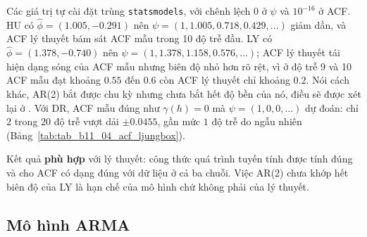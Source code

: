  Các giá trị tự cài đặt trùng \texttt{statsmodels}, với chênh lệch $0$ ở $\psi$ và $10^{-16}$ ở ACF. HU có $\hat\phi=(1.005,-0.291)$ nên $\psi=(1,1.005,0.718,0.429,\dots)$ giảm dần, và ACF lý thuyết bám sát ACF mẫu trong 10 độ trễ đầu. LY có $\hat\phi=(1.378,-0.740)$ nên $\psi=(1,1.378,1.158,0.576,\dots)$; ACF lý thuyết tái hiện dạng sóng của ACF mẫu nhưng biên độ nhỏ hơn rõ rệt, vì ở độ trễ 9 và 10 ACF mẫu đạt khoảng $0.55$ đến $0.6$ còn ACF lý thuyết chỉ khoảng $0.2$. Nói cách khác, AR(2) bắt được chu kỳ nhưng chưa bắt hết độ bền của nó, điều sẽ được xét lại ở . Với DR, ACF mẫu đúng như $\gamma(h)=0$ mà $\psi=(1,0,0,\dots)$ dự đoán: chỉ $2$ trong $20$ độ trễ vượt dải $\pm0.0455$, gần mức $1$ độ trễ do ngẫu nhiên (Bảng~\ref{tab:tab_b11_04_acf_ljungbox}).

 Kết quả \textbf{phù hợp} với lý thuyết: công thức quá trình tuyến tính được tính đúng và cho ACF có dạng đúng với dữ liệu ở cả ba chuỗi. Việc AR(2) chưa khớp hết biên độ của LY là hạn chế của mô hình chứ không phải của lý thuyết.

\subsection{Mô hình ARMA}

